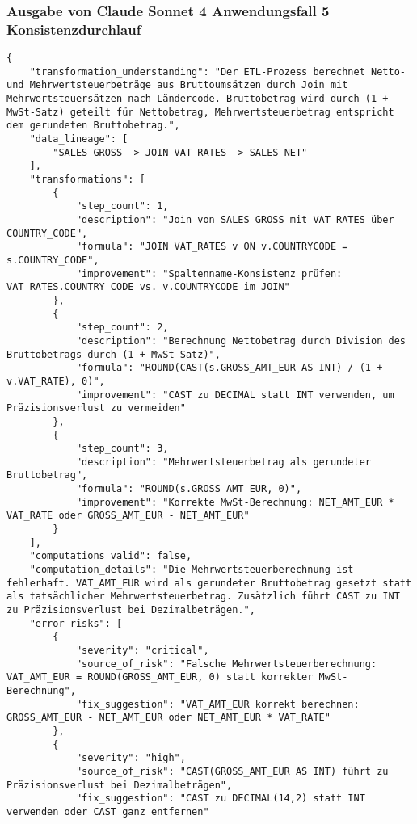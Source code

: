 \subsubsection{Ausgabe von Claude Sonnet 4 Anwendungsfall 5 Konsistenzdurchlauf}\label{anhang:subsubsec:claude_case5_prompt2}
\begin{lstlisting}[caption={Ausgabe: Claude Sonnet 4 Anwendungsfall 5 Konsistenzdurchlauf},label={claude_case5_prompt2}]
{
    "transformation_understanding": "Der ETL-Prozess berechnet Netto- und Mehrwertsteuerbeträge aus Bruttoumsätzen durch Join mit Mehrwertsteuersätzen nach Ländercode. Bruttobetrag wird durch (1 + MwSt-Satz) geteilt für Nettobetrag, Mehrwertsteuerbetrag entspricht dem gerundeten Bruttobetrag.",
    "data_lineage": [
        "SALES_GROSS -> JOIN VAT_RATES -> SALES_NET"
    ],
    "transformations": [
        {
            "step_count": 1,
            "description": "Join von SALES_GROSS mit VAT_RATES über COUNTRY_CODE",
            "formula": "JOIN VAT_RATES v ON v.COUNTRYCODE = s.COUNTRY_CODE",
            "improvement": "Spaltenname-Konsistenz prüfen: VAT_RATES.COUNTRY_CODE vs. v.COUNTRYCODE im JOIN"
        },
        {
            "step_count": 2,
            "description": "Berechnung Nettobetrag durch Division des Bruttobetrags durch (1 + MwSt-Satz)",
            "formula": "ROUND(CAST(s.GROSS_AMT_EUR AS INT) / (1 + v.VAT_RATE), 0)",
            "improvement": "CAST zu DECIMAL statt INT verwenden, um Präzisionsverlust zu vermeiden"
        },
        {
            "step_count": 3,
            "description": "Mehrwertsteuerbetrag als gerundeter Bruttobetrag",
            "formula": "ROUND(s.GROSS_AMT_EUR, 0)",
            "improvement": "Korrekte MwSt-Berechnung: NET_AMT_EUR * VAT_RATE oder GROSS_AMT_EUR - NET_AMT_EUR"
        }
    ],
    "computations_valid": false,
    "computation_details": "Die Mehrwertsteuerberechnung ist fehlerhaft. VAT_AMT_EUR wird als gerundeter Bruttobetrag gesetzt statt als tatsächlicher Mehrwertsteuerbetrag. Zusätzlich führt CAST zu INT zu Präzisionsverlust bei Dezimalbeträgen.",
    "error_risks": [
        {
            "severity": "critical",
            "source_of_risk": "Falsche Mehrwertsteuerberechnung: VAT_AMT_EUR = ROUND(GROSS_AMT_EUR, 0) statt korrekter MwSt-Berechnung",
            "fix_suggestion": "VAT_AMT_EUR korrekt berechnen: GROSS_AMT_EUR - NET_AMT_EUR oder NET_AMT_EUR * VAT_RATE"
        },
        {
            "severity": "high",
            "source_of_risk": "CAST(GROSS_AMT_EUR AS INT) führt zu Präzisionsverlust bei Dezimalbeträgen",
            "fix_suggestion": "CAST zu DECIMAL(14,2) statt INT verwenden oder CAST ganz entfernen"

\end{lstlisting}
